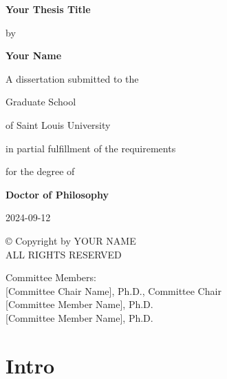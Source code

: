 \documentclass[12pt]{book}
\theoremstyle{definition}
\theoremstyle{remark}
\newcommand{\copyrightpage}{
  \thispagestyle{plain}
  \vspace*{\fill}
  \begin{center}
  © Copyright by \MakeUppercase{Your Name}\\
  ALL RIGHTS RESERVED\\
  
  \end{center}
  \vspace*{\fill}
  \newpage
}
\newcommand{\committeepage}{
  \thispagestyle{plain}
  \vspace*{2in}
  \begin{center}
  Committee Members:\\
  \vspace{0.5in}
  [Committee Chair Name], Ph.D., Committee Chair\\
  \vspace{0.25in}
  [Committee Member Name], Ph.D.\\
  \vspace{0.25in}
  [Committee Member Name], Ph.D.
  \end{center}
  \newpage
}
\begin{document}
\frontmatter
{}
\tableofcontents

\begin{titlepage}
\centering
\vspace*{\fill}
{\Large\bfseries Your Thesis Title\par}
\vspace{1cm}
{\large by\par}
\vspace{1cm}
{\large\bfseries Your Name\par}
\vspace{1cm}
{\large A dissertation submitted to the\par}
{\large Graduate School\par}
{\large of Saint Louis University\par}
{\large in partial fulfillment of the requirements\par}
{\large for the degree of\par}
\vspace{1cm}
{\large\bfseries Doctor of Philosophy\par}
\vspace{2cm}
{\large 2024-09-12\par}
\vspace*{\fill}
\end{titlepage}

\copyrightpage
\committeepage
\tableofcontents
\listoftables
\listoffigures

\mainmatter
{}

\chapter{Intro}\label{intro}
\end{document}
